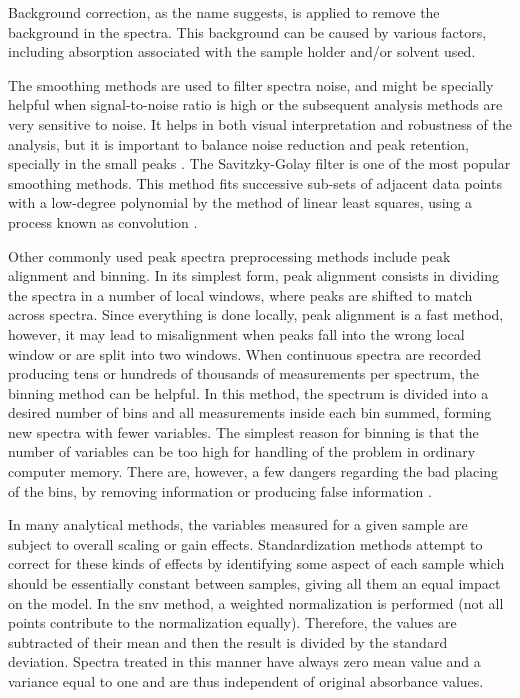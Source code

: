 Background correction, as the name suggests, is applied to remove the background in the spectra. This background can be caused by various factors, including absorption associated with the sample holder and/or solvent used. 

The smoothing methods are used to filter spectra noise, and might be specially helpful when signal-to-noise ratio is high or the subsequent analysis methods are very sensitive to noise. It helps in both visual interpretation and robustness of the analysis, but it is important to balance noise reduction and peak retention, specially in the small peaks \citep{liland2011multivariate}. The Savitzky-Golay filter is one of the most popular smoothing methods. This method fits successive sub-sets of adjacent data points with a low-degree polynomial by the method of linear least squares, using a process known as convolution \citep{savitzky1964smoothing}.

Other commonly used peak spectra preprocessing methods include peak alignment and binning. In its simplest form, peak alignment consists in dividing the spectra in a number of local windows, where peaks are shifted to match across spectra. Since everything is done locally, peak alignment is a fast method, however, it may lead to misalignment when peaks fall into the wrong local window or are split into two windows. When continuous spectra are recorded producing tens or hundreds of thousands of measurements per spectrum, the binning method can be helpful. In this method, the spectrum is divided into a desired number of bins and all measurements inside each bin summed, forming new spectra with fewer variables. The simplest reason for binning is that the number of variables can be too high for handling of the problem in ordinary computer memory. There are, however, a few dangers regarding the bad placing of the bins, by removing information or producing false information \citep{liland2011multivariate}.

In many analytical methods, the variables measured for a given sample are subject to overall scaling or gain effects. Standardization methods attempt to correct for these kinds of effects by identifying some aspect of each sample which should be essentially constant between samples, giving all them an equal impact on the model. In the \acrfull{snv} method, a weighted normalization is performed (not all points contribute to the normalization equally). Therefore, the values are subtracted of their mean and then the result is divided by the standard deviation. Spectra treated in this manner have always zero mean value and a variance equal to one and are thus independent of original absorbance values. 

